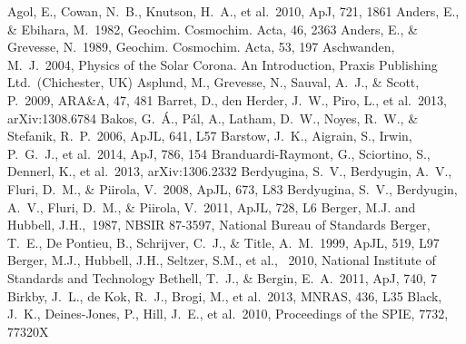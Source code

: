 \documentclass[iop]{emulateapj}
\begin{document}
\begin{thebibliography}{99}
 Agol, E., Cowan, N.~B., Knutson, H.~A., et al.\ 2010, ApJ, 721, 1861
 Anders, E., \& Ebihara, M.\ 1982, Geochim. Cosmochim. Acta, 46, 2363 
 Anders, E., \& Grevesse, N.\ 1989, Geochim. Cosmochim. Acta, 53, 197 
 Aschwanden, M.~J.\ 2004, Physics of the Solar Corona. An Introduction, Praxis Publishing Ltd.\ (Chichester, UK)
 Asplund, M., Grevesse, N., Sauval, A.~J., \& Scott, P.\ 2009, ARA\&A, 47, 481 
 Barret, D., den Herder, J.~W., Piro, L., et al.\ 2013, arXiv:1308.6784 
 Bakos, G.~{\'A}., P{\'a}l, A., Latham, D.~W., Noyes, R.~W., \& Stefanik, R.~P.\ 2006, ApJL, 641, L57 
 Barstow, J.~K., Aigrain, S., Irwin, P.~G.~J., et al.\ 2014, ApJ, 786, 154
 Branduardi-Raymont, G., Sciortino, S., Dennerl, K., et al.\ 2013, arXiv:1306.2332 
 Berdyugina, S.~V., Berdyugin, A.~V., Fluri, D.~M., \& Piirola, V.\ 2008, ApJL, 673, L83 
 Berdyugina, S.~V., Berdyugin, A.~V., Fluri, D.~M., \& Piirola, V.\ 2011, ApJL, 728, L6 
 Berger, M.J. and Hubbell, J.H.,\ 1987, NBSIR 87-3597, National Bureau of Standards
 Berger, T.~E., De Pontieu, B., Schrijver, C.~J., \& Title, A.~M.\ 1999, ApJL, 519, L97 
 Berger, M.J., Hubbell, J.H., Seltzer, S.M., et al., \ 2010, National Institute of Standards and Technology
 Bethell, T.~J., \& Bergin, E.~A.\ 2011, ApJ, 740, 7 
 Birkby, J.~L., de Kok, R.~J., Brogi, M., et al.\ 2013, MNRAS, 436, L35
 Black, J.~K., Deines-Jones, P., Hill, J.~E., et al.\ 2010, Proceedings of the SPIE, 7732, 77320X 

\end{thebibliography}
\end{document}

